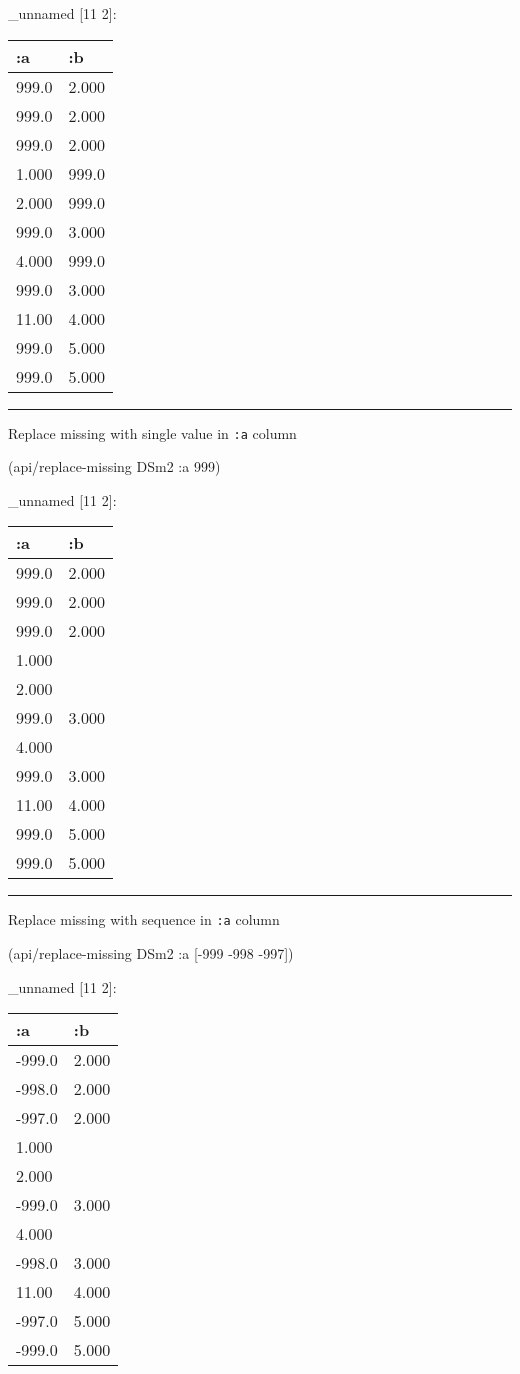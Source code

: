 \documentclass[]{article}
\newenvironment{Shaded}{\begin{snugshade}}{\end{snugshade}}
\newcommand{\DecValTok}[1]{\textcolor[rgb]{0.00,0.00,0.81}{#1}}
\newcommand{\AttributeTok}[1]{\textcolor[rgb]{0.77,0.63,0.00}{#1}}
\newcommand{\NormalTok}[1]{#1}
\begin{document}
\_unnamed {[}11 2{]}:

\begin{longtable}[]{@{}ll@{}}
\toprule
:a & :b\tabularnewline
\midrule
\endhead
999.0 & 2.000\tabularnewline
999.0 & 2.000\tabularnewline
999.0 & 2.000\tabularnewline
1.000 & 999.0\tabularnewline
2.000 & 999.0\tabularnewline
999.0 & 3.000\tabularnewline
4.000 & 999.0\tabularnewline
999.0 & 3.000\tabularnewline
11.00 & 4.000\tabularnewline
999.0 & 5.000\tabularnewline
999.0 & 5.000\tabularnewline
\bottomrule
\end{longtable}

\begin{center}\rule{0.5\linewidth}{0.5pt}\end{center}

Replace missing with single value in \texttt{:a} column

\begin{Shaded}
\begin{Highlighting}[]
\NormalTok{(api/replace-missing DSm2 }\AttributeTok{:a} \DecValTok{999}\NormalTok{)}
\end{Highlighting}
\end{Shaded}

\_unnamed {[}11 2{]}:

\begin{longtable}[]{@{}ll@{}}
\toprule
:a & :b\tabularnewline
\midrule
\endhead
999.0 & 2.000\tabularnewline
999.0 & 2.000\tabularnewline
999.0 & 2.000\tabularnewline
1.000 &\tabularnewline
2.000 &\tabularnewline
999.0 & 3.000\tabularnewline
4.000 &\tabularnewline
999.0 & 3.000\tabularnewline
11.00 & 4.000\tabularnewline
999.0 & 5.000\tabularnewline
999.0 & 5.000\tabularnewline
\bottomrule
\end{longtable}

\begin{center}\rule{0.5\linewidth}{0.5pt}\end{center}

Replace missing with sequence in \texttt{:a} column

\begin{Shaded}
\begin{Highlighting}[]
\NormalTok{(api/replace-missing DSm2 }\AttributeTok{:a}\NormalTok{ [-}\DecValTok{999} \DecValTok{-998} \DecValTok{-997}\NormalTok{])}
\end{Highlighting}
\end{Shaded}

\_unnamed {[}11 2{]}:

\begin{longtable}[]{@{}ll@{}}
\toprule
:a & :b\tabularnewline
\midrule
\endhead
-999.0 & 2.000\tabularnewline
-998.0 & 2.000\tabularnewline
-997.0 & 2.000\tabularnewline
1.000 &\tabularnewline
2.000 &\tabularnewline
-999.0 & 3.000\tabularnewline
4.000 &\tabularnewline
-998.0 & 3.000\tabularnewline
11.00 & 4.000\tabularnewline
-997.0 & 5.000\tabularnewline
-999.0 & 5.000\tabularnewline
\bottomrule
\end{longtable}
\end{document}
